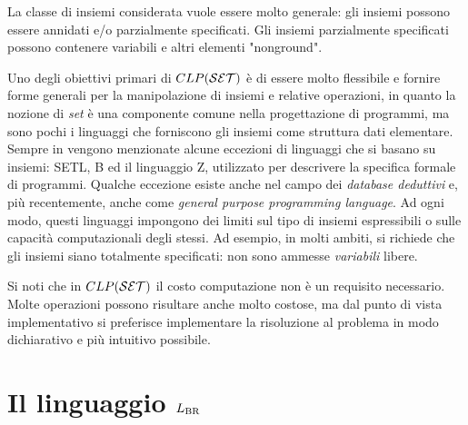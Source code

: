 La classe di insiemi considerata vuole essere molto generale: gli insiemi possono essere annidati e/o parzialmente specificati. Gli insiemi parzialmente specificati possono contenere variabili e altri elementi "nonground".

Uno degli obiettivi primari di $CLP(\mathcal{S}\mathcal{E}\mathcal{T})$ è di essere molto flessibile e fornire forme generali per la manipolazione di insiemi e relative operazioni, in quanto la nozione di \emph{set} è una componente comune nella progettazione di programmi, ma sono pochi i linguaggi che forniscono gli insiemi come struttura dati elementare.
Sempre in \cite{2000-CLP(SET)} vengono menzionate alcune eccezioni di linguaggi che si basano su insiemi: SETL, B ed il linguaggio Z, utilizzato per descrivere la specifica formale di programmi. Qualche eccezione esiste anche nel campo dei \emph{database deduttivi} e, più recentemente, anche come \emph{general purpose programming language}. Ad ogni modo, questi linguaggi impongono dei limiti sul tipo di insiemi espressibili o sulle capacità computazionali degli stessi. Ad esempio, in molti ambiti, si richiede che gli insiemi siano totalmente specificati: non sono ammesse \emph{variabili} libere.

Si noti che in $CLP(\mathcal{S}\mathcal{E}\mathcal{T})$ il costo computazione non è un requisito necessario. Molte operazioni possono risultare anche molto costose, ma dal punto di vista implementativo si preferisce implementare la risoluzione al problema in modo dichiarativo e più intuitivo possibile.



\section{Il linguaggio $L_\mathrm{BR}$}
\label{sec:lbr}





